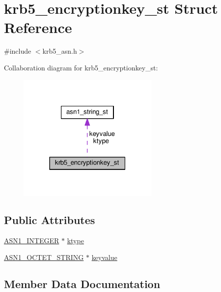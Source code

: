 \hypertarget{structkrb5__encryptionkey__st}{}\section{krb5\+\_\+encryptionkey\+\_\+st Struct Reference}
\label{structkrb5__encryptionkey__st}


{\ttfamily \#include $<$krb5\+\_\+asn.\+h$>$}



Collaboration diagram for krb5\+\_\+encryptionkey\+\_\+st\+:
\nopagebreak
\begin{figure}[H]
\begin{center}
\leavevmode
\includegraphics[width=195pt]{structkrb5__encryptionkey__st__coll__graph}
\end{center}
\end{figure}
\subsection*{Public Attributes}
\begin{DoxyCompactItemize}
\item 
\hyperlink{ossl__typ_8h_af4335399bf9774cb410a5e93de65998b}{A\+S\+N1\+\_\+\+I\+N\+T\+E\+G\+ER} $\ast$ \hyperlink{structkrb5__encryptionkey__st_a883042268f43cbab262213ebbb7887a9}{ktype}
\item 
\hyperlink{ossl__typ_8h_afbd05e94e0f0430a2b729473efec88c1}{A\+S\+N1\+\_\+\+O\+C\+T\+E\+T\+\_\+\+S\+T\+R\+I\+NG} $\ast$ \hyperlink{structkrb5__encryptionkey__st_a6bed28f0b8e2345d51f976c57f0ec240}{keyvalue}
\end{DoxyCompactItemize}


\subsection{Member Data Documentation}
